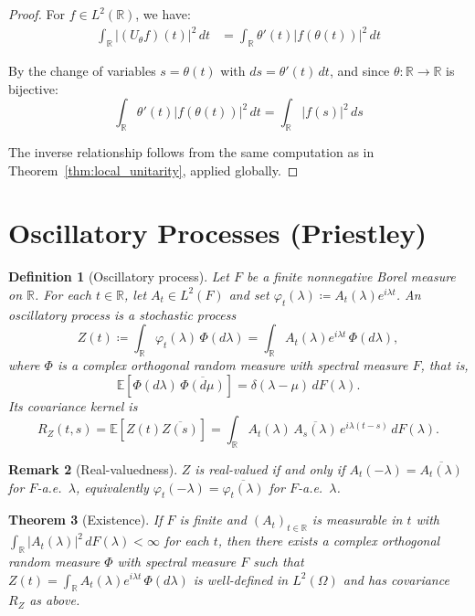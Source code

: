 \documentclass{article}
\newtheorem{theorem}{Theorem}[section]
\newtheorem{definition}[theorem]{Definition}
\newtheorem{remark}[theorem]{Remark}
\begin{document}
\begin{proof}
For $f\in L^2(\mathbb{R})$, we have:
\begin{align}
\int_{\mathbb{R}} |(U_\theta f)(t)|^2\,dt &= \int_{\mathbb{R}} \theta'(t)|f(\theta(t))|^2\,dt
\end{align}

By the change of variables $s=\theta(t)$ with $ds=\theta'(t)\,dt$, and since $\theta:\mathbb{R}\to\mathbb{R}$ is bijective:
\[
\int_{\mathbb{R}} \theta'(t)|f(\theta(t))|^2\,dt = \int_{\mathbb{R}} |f(s)|^2\,ds
\]

The inverse relationship follows from the same computation as in Theorem~\ref{thm:local_unitarity}, applied globally.
\end{proof}

\section{Oscillatory Processes (Priestley)}\label{sec:oscillatory}

\begin{definition}[Oscillatory process]\label{def:osc_proc}
Let $F$ be a finite nonnegative Borel measure on $\mathbb{R}$. For each $t\in\mathbb{R}$, let $A_t\in L^2(F)$ and set $\varphi_t(\lambda)\coloneqq A_t(\lambda)e^{i\lambda t}$. An \emph{oscillatory process} is a stochastic process
\[
Z(t)\coloneqq \int_{\mathbb{R}} \varphi_t(\lambda)\,\Phi(d\lambda)=\int_{\mathbb{R}} A_t(\lambda)e^{i\lambda t}\,\Phi(d\lambda),
\]
where $\Phi$ is a complex orthogonal random measure with spectral measure $F$, that is,
\[
\mathbb{E}\!\left[\Phi(d\lambda)\,\overline{\Phi(d\mu)}\right]=\delta(\lambda-\mu)\,dF(\lambda).
\]
Its covariance kernel is
\[
R_Z(t,s)=\mathbb{E}\!\left[Z(t)\overline{Z(s)}\right]=\int_{\mathbb{R}} A_t(\lambda)\,\overline{A_s(\lambda)}\,e^{i\lambda(t-s)}\,dF(\lambda).
\]
\end{definition}

\begin{remark}[Real-valuedness]
$Z$ is real-valued if and only if $A_t(-\lambda)=\overline{A_t(\lambda)}$ for $F$-a.e.\ $\lambda$, equivalently $\varphi_t(-\lambda)=\overline{\varphi_t(\lambda)}$ for $F$-a.e.\ $\lambda$.
\end{remark}

\begin{theorem}[Existence]\label{thm:existence_osc}
If $F$ is finite and $(A_t)_{t\in\mathbb{R}}$ is measurable in $t$ with $\int_{\mathbb{R}}|A_t(\lambda)|^2\,dF(\lambda)<\infty$ for each $t$, then there exists a complex orthogonal random measure $\Phi$ with spectral measure $F$ such that $Z(t)=\int_{\mathbb{R}} A_t(\lambda)e^{i\lambda t}\,\Phi(d\lambda)$ is well-defined in $L^2(\Omega)$ and has covariance $R_Z$ as above.
\end{theorem}
\end{document}
